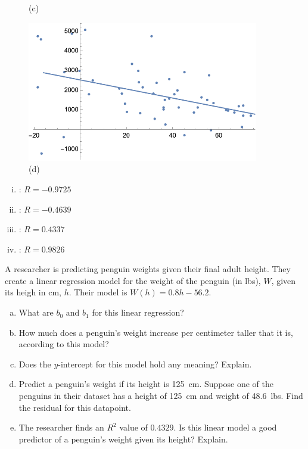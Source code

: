 \documentclass[11pt,letterpaper]{article}
\begin{document}
\begin{figure}[!ht]
\begin{minipage}{0.45\textwidth}
	   \caption*{(c)}
	\end{minipage}
	\begin{minipage}{0.45\textwidth}
	   \centering
	   \includegraphics[width=0.9\textwidth]{reg4.png}
	   \caption*{(d)}
	\end{minipage}
	\end{figure}

\begin{enumerate}[(i)]
\item \underline{\hspace{1.5cm}}: $R= -0.9725$
\item \underline{\hspace{1.5cm}}: $R= -0.4639$
\item \underline{\hspace{1.5cm}}: $R= 0.4337$
\item\underline{\hspace{1.5cm}}: $R= 0.9826$
\end{enumerate} 



\newpage



 A researcher is predicting penguin weights given their final adult height. They create a linear regression model for the weight of the penguin (in lbs), $W$, given its heigh in cm, $h$. Their model is $W(h)= 0.8h - 56.2$.
	\begin{enumerate}[(a)]
	\item What are $b_0$ and $b_1$ for this linear regression?
	\item How much does a penguin's weight increase per centimeter taller that it is, according to this model?
	\item Does the $y$-intercept for this model hold any meaning? Explain. 
	\item Predict a penguin's weight if its height is 125~cm. Suppose one of the penguins in their dataset has a height of 125~cm and weight of 48.6~lbs. Find the residual for this datapoint. 
	\item The researcher finds an $R^2$ value of $0.4329$. Is this linear model a good predictor of a penguin's weight given its height? Explain. 
	\end{enumerate}
\end{document}
